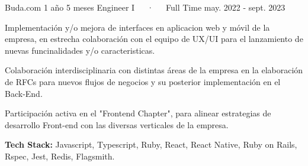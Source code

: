 

\begin{cventries}

  \cventry
    {Buda.com} %
    {1 año 5 meses} %
    {Engineer I~~~·~~~Full Time } %
    {may. 2022 - sept. 2023} %
    {
      \begin{cvitems}
        \item {Implementación y/o mejora de interfaces en aplicacion web y móvil de la empresa, en estrecha 
        colaboración con el equipo de UX/UI para el lanzamiento de nuevas funcinalidades y/o caracteristicas.}
        \item {Colaboración interdisciplinaria con distintas áreas de la empresa en la elaboración de RFCs para
         nuevos flujos de negocios y su posterior implementación en el Back-End.}
        \item {Participación activa en el "Frontend Chapter", para alinear estrategias de desarrollo Front-end 
        con las diversas verticales de la empresa.}
        \item {\textbf{Tech Stack:} Javascript, Typescript, Ruby, React, React Native, Ruby on Rails, Rspec, Jest, Redis, Flagsmith.}
      \end{cvitems}
    }
  

\end{cventries}
